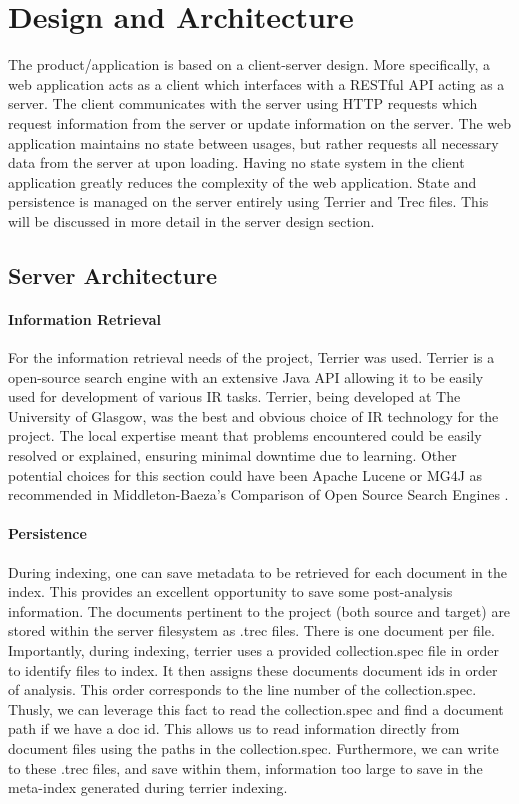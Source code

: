 \documentclass{l4proj}
\begin{document}
\section{Design and Architecture}
The product/application is based on a client-server design. More specifically, a web application acts as a client which interfaces with a RESTful API acting as a server.
The client communicates with the server using HTTP requests which request information from the server or update information on the server.
The web application maintains no state between usages, but rather requests all necessary data from the server at upon loading. Having no state system in the client application greatly reduces the complexity of the web application.
State and persistence is managed on the server entirely using Terrier and Trec files. This will be discussed in more detail in the server design section.

\subsection{Server Architecture}
\paragraph{Information Retrieval}
For the information retrieval needs of the project, Terrier was used. Terrier is a open-source search engine with an extensive Java API allowing it to be easily used for development of various IR tasks.
Terrier, being developed at The University of Glasgow, was the best and obvious choice of IR technology for the project. The local expertise meant that problems encountered could be easily resolved or explained, ensuring minimal downtime due to learning.
Other potential choices for this section could have been Apache Lucene or MG4J as recommended in Middleton-Baeza's Comparison of Open Source Search Engines \cite{middletonbaeza}.

\paragraph{Persistence}
During indexing, one can save metadata to be retrieved for each document in the index. This provides an excellent opportunity to save some post-analysis information.
The documents pertinent to the project (both source and target) are stored within the server filesystem as .trec files. There is one document per file.
Importantly, during indexing, terrier uses a provided collection.spec file in order to identify files to index. It then assigns these documents document ids in order of analysis. This order corresponds to the line number of the collection.spec.
Thusly, we can leverage this fact to read the collection.spec and find a document path if we have a doc id.
This allows us to read information directly from document files using the paths in the collection.spec.
Furthermore, we can write to these .trec files, and save within them, information too large to save in the meta-index generated during terrier indexing.
\end{document}
